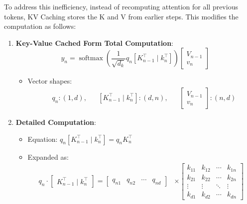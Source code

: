 \documentclass[times, review, 10pt]{elsarticle}
\begin{document}
To address this inefficiency, instead of recomputing attention for all previous tokens, KV Caching stores the K and V from earlier steps. This modifies the computation as follows:

\begin{enumerate}
    \item[1] \textbf{Key-Value Cached Form Total Computation}:
    \begin{equation}
    \label{eq:app-kv-yn}
    y_n = \operatorname{softmax}\left(\frac{1}{\sqrt{d_k}} q_n\left[K_{n-1}^{\top} \mid k_n^{\top}\right]\right)\left[\begin{array}{c}
    V_{n-1} \\
    v_n
    \end{array}\right]
    \end{equation}

    \begin{itemize}
        \item Vector shapes:
        \begin{equation}
        \label{eq:app-kv-shapes}
        \begin{aligned}
        & q_n:(1, d), && {\left[K_{n-1}^{\top} \mid k_n^{\top}\right]:(d, n)}, && {\left[\begin{array}{c}V_{n-1} \\v_n\end{array}\right]:(n, d)}
        \end{aligned}
        \end{equation}
    \end{itemize}

    \item[2.] \textbf{Detailed Computation}:
    \begin{itemize}
        \item Equation: \(q_n\left[K_{n-1}^{\top} \mid k_n^{\top}\right] = q_n K_n^{\top}\)
        \item Expanded as:
        \begin{align}
            q_n \cdot 
            \left[
            \begin{array}{llll}
                K_{n-1}^{\top} \mid k_n^{\top}
            \end{array}
            \right]  =
            \begin{bmatrix} 
                q_{n1} & q_{n2} & \cdots & q_{nd} 
            \end{bmatrix}  
            &\times 
            \begin{bmatrix}
                k_{11} & k_{12} & \cdots & k_{1n} \\
                k_{21} & k_{22} & \cdots & k_{2n} \\
                \vdots & \vdots & \ddots & \vdots \\
                k_{d1} & k_{d2} & \cdots & k_{dn}
            \end{bmatrix}
            \label{eq:app-kv-expand}
        \end{align}





\end{itemize}
\end{enumerate}
\end{document}
